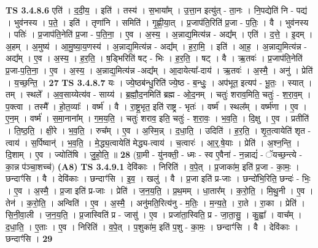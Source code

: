 \documentclass[17pt]{extarticle}
\begin{document}
                  \newline
                                \textbf{ TS 3.4.8.6} \newline
                  एति॑ । द॒दी॒य॒ । इति॑ । तस्य॑ । स॒भाया᳚म् । उ॒त्ता॒न इत्यु॑त् - ता॒नः । नि॒पद्येति॑ नि - पद्य॑ । भुव॑नस्य । प॒ते॒ । इति॑ । तृणा॑नि । समिति॑ । गृ॒ह्णी॒या॒त् । प्र॒जाप॑ति॒रिति॑ प्र॒जा - प॒तिः॒ । वै । भुव॑नस्य । पतिः॑ । प्र॒जाप॑ति॒नेति॑ प्र॒जा - प॒ति॒ना॒ । ए॒व । अ॒स्य॒ । अ॒न्नाद्य॒मित्य॑न्न - अद्य᳚म् । एति॑ । द॒त्ते॒ । इ॒दम् । अ॒हम् । अ॒मुष्य॑ । आ॒मु॒ष्या॒य॒णस्य॑ । अ॒न्नाद्य॒मित्य॑न्न - अद्य᳚म् । ह॒रा॒मि॒ । इति॑ । आ॒ह॒ । अ॒न्नाद्य॒मित्य॑न्न - अद्य᳚म् । ए॒व । अ॒स्य॒ । ह॒र॒ति॒ । ष॒ड्भिरिति॑ षट् - भिः । ह॒र॒ति॒ । षट् । वै । ऋ॒तवः॑ । प्र॒जाप॑ति॒नेति॑ प्र॒जा-प॒ति॒ना॒ । ए॒व । अ॒स्य॒ । अ॒न्नाद्य॒मित्य॑न्न -अद्य᳚म् । आ॒दायेत्या᳚-दाय॑ । ऋ॒तवः॑ । अ॒स्मै॒ । अनु॑ । प्रेति॑ । य॒च्छ॒न्ति॒ । \textbf{  27} \newline
                  \newline
                                \textbf{ TS 3.4.8.7} \newline
                  यः । ज्ये॒ष्ठब॑न्धु॒रिति॑ ज्ये॒ष्ठ - ब॒न्धुः॒ । अप॑भूत॒ इत्यप॑ - भू॒तः॒ । स्यात् । तम् । स्थले᳚ । अ॒व॒साय्येत्य॑व - साय्य॑ । ब्र॒ह्मौ॒द॒नमिति॑ ब्रह्म - ओ॒द॒नम् । चतुः॑ शराव॒मिति॒ चतुः॑ - श॒रा॒व॒म् । प॒क्त्वा । तस्मै᳚ । हो॒त॒व्याः᳚ । वर्ष्म॑ । वै । रा॒ष्ट्र॒भृत॒ इति॑ राष्ट्र - भृतः॑ । वर्ष्म॑ । स्थल᳚म् । वर्ष्म॑णा । ए॒व । ए॒न॒म् । वर्ष्म॑ । स॒मा॒नाना᳚म् । ग॒म॒य॒ति॒ । चतुः॑ शराव॒ इति॒ चतुः॑ - श॒रा॒वः॒ । भ॒व॒ति॒ । दि॒क्षु । ए॒व । प्रतीति॑ । ति॒ष्ठ॒ति॒ । क्षी॒रे । भ॒व॒ति॒ । रुच᳚म् । ए॒व । अ॒स्मि॒न्न् । द॒धा॒ति॒ । उदिति॑ । ह॒र॒ति॒ । शृ॒त॒त्वायेति॑ शृत - त्वाय॑ । स॒र्पिष्वान्॑ । भ॒व॒ति॒ । मे॒द्ध्य॒त्वायेति॑ मेद्ध्य-त्वाय॑ । च॒त्वारः॑ । आ॒र्॒.षे॒याः । प्रेति॑ । अ॒श्न॒न्ति॒ । दि॒शाम् । ए॒व । ज्योति॑षि । जु॒हो॒ति॒ ॥ \textbf{  28} \newline
                  \newline
                      (ग्रा॒मी - यु॑नक्ती॒ - ध्मः - स्व ए॒वैना॑ - न॒न्नाद्यं॑ - ॅयच्छ॒न्त्ये - का॒न्न प॑ञ्चा॒शच्च॑)  \textbf{(A8)} \newline \newline
                                \textbf{ TS 3.4.9.1} \newline
                  देवि॑काः । निरिति॑ । व॒पे॒त् । प्र॒जाका॑म॒ इति॑ प्र॒जा - का॒मः॒ । छन्दाꣳ॑सि । वै । देवि॑काः । छन्दाꣳ॑सि । इ॒व॒ । खलु॑ । वै । प्र॒जा इति॑ प्र-जाः । छन्दो॑भि॒रिति॒ छन्दः॑ - भिः॒ । ए॒व । अ॒स्मै॒ । प्र॒जा इति॑ प्र-जाः । प्रेति॑ । ज॒न॒य॒ति॒ । प्र॒थ॒मम् । धा॒तार᳚म् । क॒रो॒ति॒ । मि॒थु॒नी । ए॒व । तेन॑ । क॒रो॒ति॒ । अन्विति॑ । ए॒व । अ॒स्मै॒ । अनु॑मति॒रित्य॑नु - म॒तिः॒ । म॒न्य॒ते॒ । रा॒ते । रा॒का । प्रेति॑ । सि॒नी॒वा॒ली । ज॒न॒य॒ति॒ । प्र॒जास्विति॑ प्र - जासु॑ । ए॒व । प्रजा॑ता॒स्विति॒ प्र - जा॒ता॒सु॒ । कु॒ह्वा᳚ । वाच᳚म् । द॒धा॒ति॒ । ए॒ताः । ए॒व । निरिति॑ । व॒पे॒त् । प॒शुका॑म॒ इति॑ प॒शु - का॒मः॒ । छन्दाꣳ॑सि । वै । देवि॑काः । छन्दाꣳ॑सि । \textbf{  29} \newline
\end{document}
